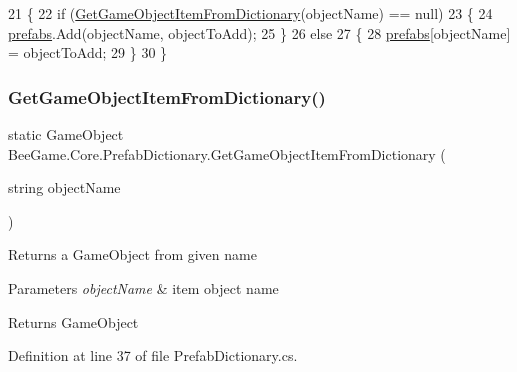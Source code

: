 \begin{DoxyCode}
21         \{
22             \textcolor{keywordflow}{if} (\hyperlink{class_bee_game_1_1_core_1_1_prefab_dictionary_a5435ea289663e612fc964438691e32d0}{GetGameObjectItemFromDictionary}(objectName) == null)
23             \{
24                 \hyperlink{class_bee_game_1_1_core_1_1_prefab_dictionary_a209d61a11be378eab228e65b439e485f}{prefabs}.Add(objectName, objectToAdd);
25             \}
26             \textcolor{keywordflow}{else}
27             \{
28                 \hyperlink{class_bee_game_1_1_core_1_1_prefab_dictionary_a209d61a11be378eab228e65b439e485f}{prefabs}[objectName] = objectToAdd;
29             \}
30         \}
\end{DoxyCode}
\mbox{\label{class_bee_game_1_1_core_1_1_prefab_dictionary_a5435ea289663e612fc964438691e32d0}} 
\subsubsection{\texorpdfstring{Get\+Game\+Object\+Item\+From\+Dictionary()}{GetGameObjectItemFromDictionary()}}
{\footnotesize\ttfamily static Game\+Object Bee\+Game.\+Core.\+Prefab\+Dictionary.\+Get\+Game\+Object\+Item\+From\+Dictionary (\begin{DoxyParamCaption}\item[{string}]{object\+Name }\end{DoxyParamCaption})\hspace{0.3cm}{\ttfamily [static]}}



Returns a Game\+Object from given name 


\begin{DoxyParams}{Parameters}
{\em object\+Name} & item object name\\
\hline
\end{DoxyParams}
\begin{DoxyReturn}{Returns}
Game\+Object
\end{DoxyReturn}


Definition at line 37 of file Prefab\+Dictionary.\+cs.


